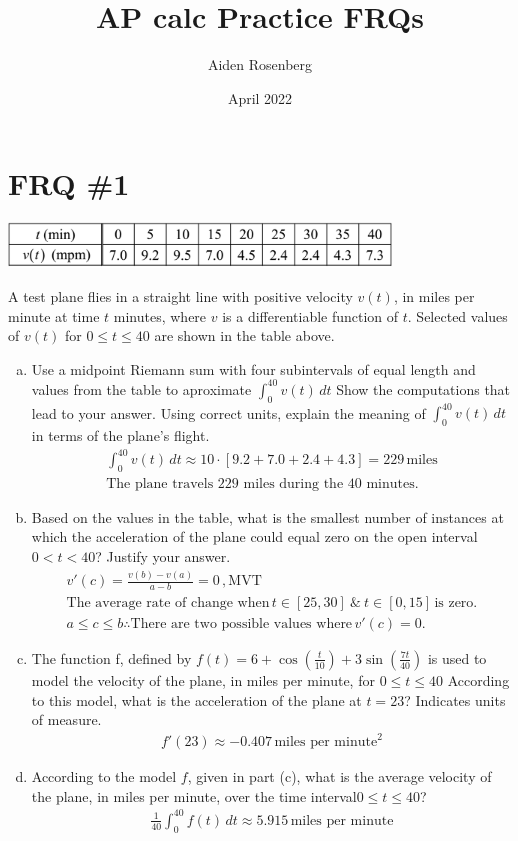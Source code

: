 \documentclass[11pt,letterpaper]{article}
\title{AP calc Practice FRQs}
\author{Aiden Rosenberg}
\date{April 2022}
\begin{document}
\maketitle
\section{FRQ \#1}
\begin{center}
    \includegraphics[width=4in]{table7.png}
\end{center}
A test plane flies in a straight line with positive velocity $v(t)$, in miles per minute at time $t$ minutes, where $v$ is a differentiable function of $t$. Selected values of  $v(t)$ for $0\leq t\leq 40 $ are shown in the table above.
\begin{enumerate} [a.)]
    \item Use a midpoint Riemann sum with four subintervals of equal length and values from the table to aproximate $\int_{0}^{40} v(t) \, dt$ Show the computations that lead to your answer. Using correct units, explain the meaning of $\int_{0}^{40} v(t) \, dt$ in terms of the plane’s flight.
    \begin{align*}
        \int_{0}^{40} v(t) \, dt \approx 10 \cdot [9.2+7.0+2.4+4.3] = 229 \, \text {miles}\\
        \text{The plane travels 229 miles during the 40 minutes}.
    \end{align*}
    \item Based on the values in the table, what is the smallest number of instances at which the acceleration of the plane could equal zero on the open interval $0<t<40$? Justify your answer.
    \begin{align*}
        v'(c)=\frac{v(b)-v(a)}{a-b}=0 \, , \text{MVT} \\
        \text{The average rate of change when} \, t\in[25,30] \ \& \ t\in[0,15] \, \text{is zero}.\\
        a \leq c \leq b \therefore \text{There are two possible values where} \, v'(c)=0.
    \end{align*}
    \item The function f, defined by $f(t)=6+\cos(\frac{t}{10})+3\sin(\frac{7t}{40})$  is used to model the velocity of the plane, in miles per minute, for $0\leq t\leq 40$ According to this model, what is the acceleration of the plane at $t = 23$? Indicates units of measure.
    \begin{align*}
        f'(23) \approx -0.407 \, \text {miles per minute}^2
    \end{align*}
    \item According to the model $f$, given in part (c), what is the average velocity of the plane, in miles per minute, over the time interval$0\leq t\leq 40$?
    \begin{align*}
        \frac{1}{40}\int_{0}^{40} f(t) \, dt \approx 5.915 \, \text{miles per minute}
    \end{align*}
\end{enumerate}
\end{document}
